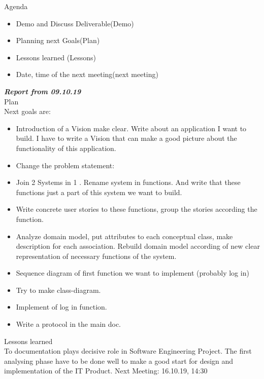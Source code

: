\documentclass{scrartcl}
\begin{document}
Agenda

\begin{itemize}
  	\item Demo and Discuss Deliverable(Demo)
  	\item Planning next Goals(Plan)
  	\item Lessons learned (Lessons)
  	\item Date, time of the next meeting(next meeting)
 \end{itemize} 	


\textbf{\textit{Report from 09.10.19}}\\
Plan\\
Next goals are: 
\begin{itemize}


	\item Introduction of a Vision make clear. Write about an application I want to build. I have to write a Vision that can make a good picture about the functionality of this application.
	\item	Change the problem statement: 
	\item	Join 2 Systems in 1 . Rename system in functions. And write that these functions just a part of this system we want to build. 
	\item	Write concrete user stories to these functions, group the stories according the function.
	\item	Analyze domain model, put attributes to each conceptual class, make description for each association. Rebuild domain model according of new clear representation of necessary functions of the system.
	\item	Sequence diagram of first function we want to implement (probably log in)
	\item	Try to make class-diagram.
	\item	Implement of log in function.
	\item	Write a protocol in the main doc.
\end{itemize}	
Lessons learned\\
To documentation plays decisive role in Software Engineering Project. The first analysing phase have to be done well to make a good start for design and implementation of the IT Product.
Next Meeting: 16.10.19, 14:30\\
\end{document}
